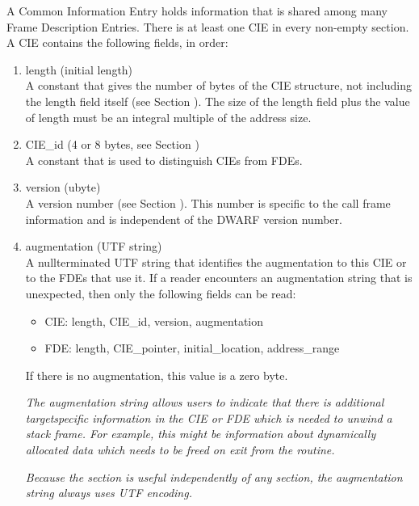 A Common Information Entry holds information that is shared
among many Frame Description Entries. There is at least one
CIE in every non-empty  section. A CIE contains
the following fields, in order:

\begin{enumerate}[1.]
\item length (initial length)  \\
A constant that gives the number of bytes of the CIE structure,
not including the length field itself 
(see Section ). 
The
size of the length field plus the value of length must be an
integral multiple of the address size.

\item  CIE\_id (4 or 8 bytes, see Section ) \\
A constant that is used to distinguish CIEs from FDEs.

\item  version (ubyte) \\
A version number 
(see Section ). 
This number is specific to the call frame information
and is independent of the DWARF version number.


\item  augmentation (UTF string) \\
A null\dash terminated UTF string that identifies the augmentation
to this CIE or to the FDEs that use it. If a reader encounters
an augmentation string that is unexpected, then only the
following fields can be read:


\begin{itemize}

\item CIE: length, CIE\_id, version, augmentation

\item FDE: length, CIE\_pointer, initial\_location, address\_range

\end{itemize}
If there is no augmentation, this value is a zero byte.

\textit{The augmentation string allows users to indicate that there
is additional target\dash specific information in the CIE or FDE
which is needed to unwind a stack frame. For example, this
might be information about dynamically allocated data which
needs to be freed on exit from the routine.}

\textit{Because the  section is useful independently of
any  section, the augmentation string always uses
UTF encoding.}


\end{enumerate}

